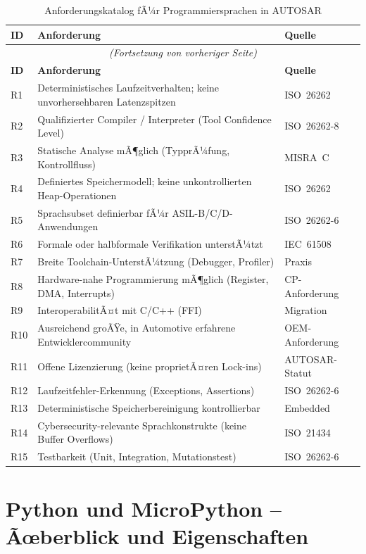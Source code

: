 ﻿\documentclass[12pt,a4paper,twoside]{article}
\begin{document}
\begin{longtable}{lp{8cm}l}
\caption{Anforderungskatalog fÃ¼r Programmiersprachen in AUTOSAR}
\label{tab:anforderungen}\\
\toprule
\textbf{ID} & \textbf{Anforderung} & \textbf{Quelle} \\
\midrule
\endfirsthead
\multicolumn{3}{c}{\small\itshape (Fortsetzung von vorheriger Seite)}\\
\toprule
\textbf{ID} & \textbf{Anforderung} & \textbf{Quelle} \\
\midrule
\endhead
\bottomrule
\endfoot
R1  & Deterministisches Laufzeitverhalten; keine unvorhersehbaren Latenzspitzen & ISO~26262 \\
R2  & Qualifizierter Compiler / Interpreter (Tool Confidence Level) & ISO~26262-8 \\
R3  & Statische Analyse mÃ¶glich (TypprÃ¼fung, Kontrollfluss) & MISRA~C \\
R4  & Definiertes Speichermodell; keine unkontrollierten Heap-Operationen & ISO~26262 \\
R5  & Sprachsubset definierbar fÃ¼r ASIL-B/C/D-Anwendungen & ISO~26262-6 \\
R6  & Formale oder halbformale Verifikation unterstÃ¼tzt & IEC~61508 \\
R7  & Breite Toolchain-UnterstÃ¼tzung (Debugger, Profiler) & Praxis \\
R8  & Hardware-nahe Programmierung mÃ¶glich (Register, DMA, Interrupts) & CP-Anforderung \\
R9  & InteroperabilitÃ¤t mit C/C++ (FFI) & Migration \\
R10 & Ausreichend groÃŸe, in Automotive erfahrene Entwicklercommunity & OEM-Anforderung \\
R11 & Offene Lizenzierung (keine proprietÃ¤ren Lock-ins) & AUTOSAR-Statut \\
R12 & Laufzeitfehler-Erkennung (Exceptions, Assertions) & ISO~26262-6 \\
R13 & Deterministische Speicherbereinigung kontrollierbar & Embedded \\
R14 & Cybersecurity-relevante Sprachkonstrukte (keine Buffer Overflows) & ISO~21434 \\
R15 & Testbarkeit (Unit, Integration, Mutationstest) & ISO~26262-6 \\
\end{longtable}

\section{Python und MicroPython -- Ãœberblick und Eigenschaften}
\label{sec:python_micropython}
\end{document}
